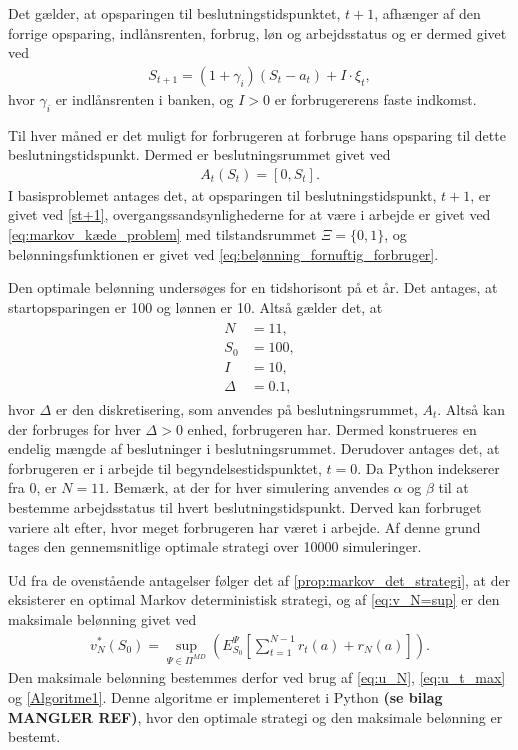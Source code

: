 Det gælder, at opsparingen til beslutningstidspunktet, $t+1$, afhænger af den forrige opsparing, indlånsrenten, forbrug, løn og arbejdsstatus og er dermed givet ved
\begin{align}\label{st+1}
    S_{t+1}=(1+\gamma_i)(S_t-a_t)+I \cdot \xi_t,
\end{align}
hvor $\gamma_i$ er indlånsrenten i banken, og $I>0$ er forbrugererens faste indkomst.

Til hver måned er det muligt for forbrugeren at forbruge hans opsparing til dette beslutningstidspunkt. Dermed er beslutningsrummet givet ved
\begin{align*}
    A_t(S_t) = \left[0, S_t\right].
\end{align*}
%
I basisproblemet antages det, at opsparingen til beslutningstidspunkt, $t+1$, er givet ved \eqref{st+1}, overgangssandsynlighederne for at være i arbejde er givet ved \eqref{eq:markov_kæde_problem} med tilstandsrummet $\Xi = \{0,1\}$, og belønningsfunktionen er givet ved \eqref{eq:belønning_fornuftig_forbruger}. 

Den optimale belønning undersøges for en tidshorisont på et år. Det antages, at startopsparingen er 100 og lønnen er 10. Altså gælder det, at
\begin{align}\label{damdamdam..}
\begin{split}
    N &= 11,\\
    S_0 &= 100,\\
    I &= 10,\\
    \Delta &= 0.1,
    \end{split}
\end{align}
hvor $\Delta$ er den diskretisering, som anvendes på beslutningsrummet, $A_t$. Altså kan der forbruges for hver $\Delta>0$ enhed, forbrugeren har. Dermed konstrueres en endelig mængde af beslutninger i beslutningsrummet. Derudover antages det, at forbrugeren er i arbejde til begyndelsestidspunktet, $t=0$. Da Python indekserer fra 0, er $N=11$. Bemærk, at der for hver simulering anvendes $\alpha$ og $\beta$ til at bestemme arbejdsstatus til hvert beslutningstidspunkt. Derved kan forbruget variere alt efter, hvor meget forbrugeren har været i arbejde. Af denne grund tages den gennemsnitlige optimale strategi over 10000 simuleringer.

Ud fra de ovenstående antagelser følger det af \autoref{prop:markov_det_strategi}, at der eksisterer en optimal Markov deterministisk strategi, og af \eqref{eq:v_N=sup} er den maksimale belønning givet ved
\begin{align*}
    v_N^{*} (S_0) = \sup_{\Psi\in \Pi^{MD}}\left( E^{\Psi}_{S_0}\left[\sum_{t=1}^{N-1} r_t(a) + r_N(a)\right] \right).
\end{align*}
Den maksimale belønning bestemmes derfor ved brug af \eqref{eq:u_N}, \eqref{eq:u_t_max} og \autoref{Algoritme1}. Denne algoritme er implementeret i Python \textbf{(se bilag MANGLER REF)}, hvor den optimale strategi og den maksimale belønning er bestemt. 

